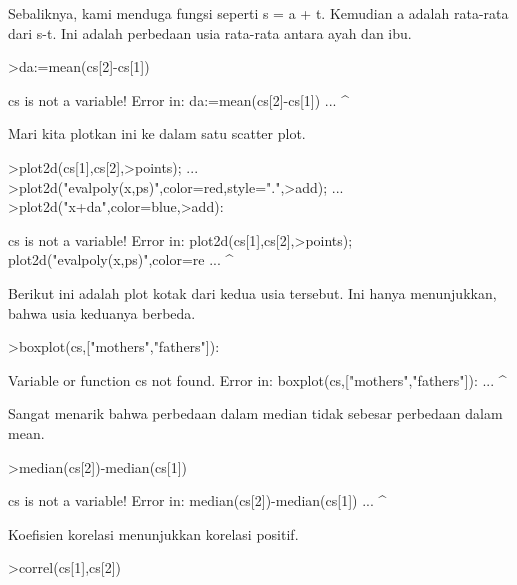 \documentclass[a4paper,10pt]{article}
\begin{document}
\begin{eulernotebook}
\begin{eulercomment}
Sebaliknya, kami menduga fungsi seperti s = a + t. Kemudian a adalah
rata-rata dari s-t. Ini adalah perbedaan usia rata-rata antara ayah
dan ibu.
\end{eulercomment}
\begin{eulerprompt}
>da:=mean(cs[2]-cs[1])
\end{eulerprompt}
\begin{euleroutput}
  cs is not a variable!
  Error in:
  da:=mean(cs[2]-cs[1]) ...
                ^
\end{euleroutput}
\begin{eulercomment}
Mari kita plotkan ini ke dalam satu scatter plot.
\end{eulercomment}
\begin{eulerprompt}
>plot2d(cs[1],cs[2],>points);  ...
>plot2d("evalpoly(x,ps)",color=red,style=".",>add);  ...
>plot2d("x+da",color=blue,>add):
\end{eulerprompt}
\begin{euleroutput}
  cs is not a variable!
  Error in:
  plot2d(cs[1],cs[2],>points);  plot2d("evalpoly(x,ps)",color=re ...
              ^
\end{euleroutput}
\begin{eulercomment}
Berikut ini adalah plot kotak dari kedua usia tersebut. Ini hanya
menunjukkan, bahwa usia keduanya berbeda.
\end{eulercomment}
\begin{eulerprompt}
>boxplot(cs,["mothers","fathers"]):
\end{eulerprompt}
\begin{euleroutput}
  Variable or function cs not found.
  Error in:
  boxplot(cs,["mothers","fathers"]): ...
            ^
\end{euleroutput}
\begin{eulercomment}
Sangat menarik bahwa perbedaan dalam median tidak sebesar perbedaan
dalam mean.
\end{eulercomment}
\begin{eulerprompt}
>median(cs[2])-median(cs[1])
\end{eulerprompt}
\begin{euleroutput}
  cs is not a variable!
  Error in:
  median(cs[2])-median(cs[1]) ...
              ^
\end{euleroutput}
\begin{eulercomment}
Koefisien korelasi menunjukkan korelasi positif.
\end{eulercomment}
\begin{eulerprompt}
>correl(cs[1],cs[2])

\end{eulerprompt}
\end{eulernotebook}
\end{document}
